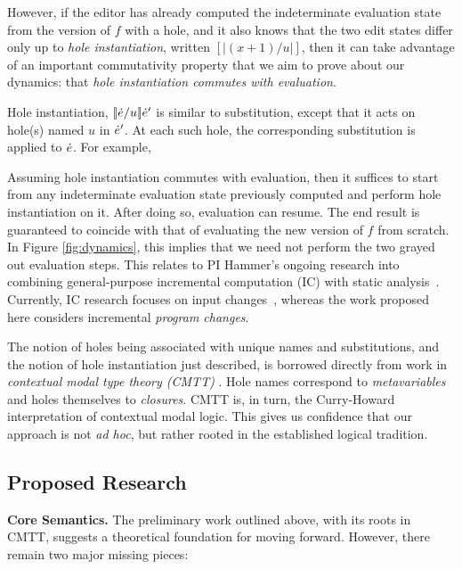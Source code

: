 However, if the editor has already computed the indeterminate evaluation 
state from the version of $f$ with a hole, and it also knows that the 
two edit states differ only up to \emph{hole instantiation}, written 
$[\!| (x+1) / u
|\!]$, then it can take advantage of an important commutativity property that we aim 
to prove about our dynamics: that 
\emph{hole instantiation commutes with evaluation}. 

Hole instantiation, $[\!| \dot{e} / u |\!]\dot{e}'$ is similar to substitution, except that it acts on
 hole(s) named $u$ in $\dot{e}'$. At each such hole, the corresponding substitution is applied to $\dot{e}$. For example,

Assuming hole instantiation commutes with evaluation, then it suffices to start from any indeterminate evaluation 
state previously computed and perform hole instantiation on it. After doing so, evaluation can resume. The end result is guaranteed to coincide with that of evaluating the new version of $f$ from scratch. In Figure \ref{fig:dynamics}, this implies that we need not perform the two grayed out evaluation steps. This relates to PI Hammer's
ongoing research into combining general-purpose incremental
computation (IC) with static analysis~\cite{OVV2016}. 
%
Currently, IC research focuses on input
changes~\citep{TypedAdapton2016, Fisher2016, Hammer2015, Chen2014,
Hammer2014, Chen2011, Hammer2011, Hammer2009, Hammer2008}, whereas the
work proposed here considers incremental \emph{program changes}.

The notion of holes being associated with unique names and substitutions, and the notion of hole instantiation just described, is borrowed directly from work in \emph{contextual modal type theory (CMTT)} \cite{Nanevski2008}. Hole names correspond to \emph{metavariables} and holes themselves to \emph{closures}. CMTT is, in turn, the Curry-Howard interpretation of contextual modal logic. This gives us confidence that our approach is not \emph{ad hoc}, but rather rooted in the established logical tradition.

\subsection{Proposed Research}

\noindent\textbf{Core Semantics.} The preliminary work outlined above, with its roots in CMTT, suggests a theoretical foundation for moving forward. However, there remain two major missing pieces:

